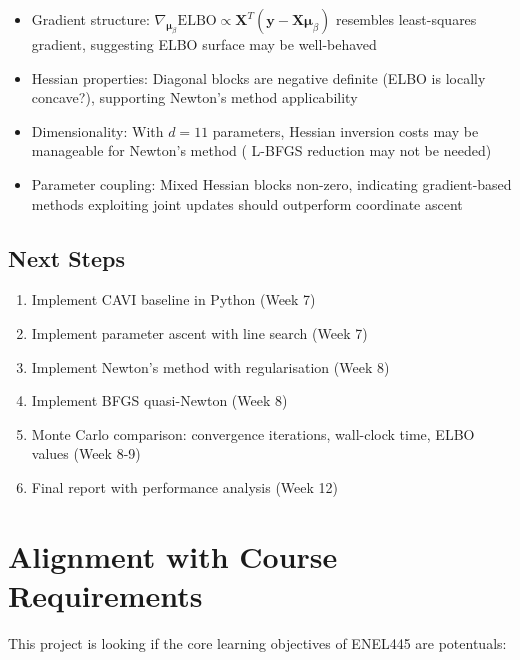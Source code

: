 \documentclass[11pt]{article}
\newcommand{\ELBO}{\text{ELBO}}
\begin{document}
\begin{itemize}
\item Gradient structure: $\nabla_{\bm{\mu}_\beta} \ELBO \propto \bm{X}^T(\bm{y} - \bm{X}\bm{\mu}_\beta)$ resembles least-squares gradient, suggesting ELBO surface may be well-behaved

\item Hessian properties: Diagonal blocks are negative definite (ELBO is locally concave?), supporting Newton's method applicability

\item Dimensionality: With $d=11$ parameters, Hessian inversion costs may be manageable for Newton's method ( L-BFGS reduction may not be needed)

\item Parameter coupling: Mixed Hessian blocks non-zero, indicating gradient-based methods exploiting joint updates should outperform coordinate ascent
\end{itemize}
\newpage
\subsection*{Next Steps}

\begin{enumerate}
\item Implement CAVI baseline in Python (Week 7)
\item Implement parameter ascent with line search (Week 7)
\item Implement Newton's method with regularisation (Week 8)
\item Implement BFGS quasi-Newton (Week 8)
\item Monte Carlo comparison: convergence iterations, wall-clock time, ELBO values (Week 8-9)
\item Final report with performance analysis (Week 12)
\end{enumerate}

\section*{Alignment with Course Requirements}

This project is looking if  the core learning objectives of ENEL445 are potentuals:
\end{document}
